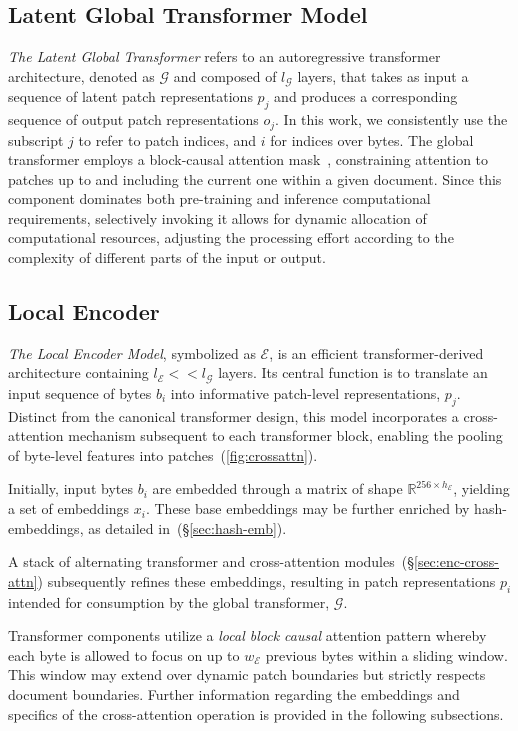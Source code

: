 \subsection{Latent Global Transformer Model}

\textit{The Latent Global Transformer} refers to an autoregressive transformer architecture, denoted as $\mathcal{G}$ and composed of $l_{\mathcal{G}}$ layers, that takes as input a sequence of latent patch representations $p_j$ and produces a corresponding sequence of output patch representations $o_j$. In this work, we consistently use the subscript $j$ to refer to patch indices, and $i$ for indices over bytes. The global transformer employs a block-causal attention mask~\citep{dubey2024llama}, constraining attention to patches up to and including the current one within a given document. Since this component dominates both pre-training and inference computational requirements, selectively invoking it allows for dynamic allocation of computational resources, adjusting the processing effort according to the complexity of different parts of the input or output.

\subsection{Local Encoder}
\label{section:local}

\textit{The Local Encoder Model}, symbolized as $\mathcal{E}$, is an efficient transformer-derived architecture containing $l_{\mathcal{E}} << l_{\mathcal{G}}$ layers. Its central function is to translate an input sequence of bytes $b_i$ into informative patch-level representations, $p_j$. Distinct from the canonical transformer design, this model incorporates a cross-attention mechanism subsequent to each transformer block, enabling the pooling of byte-level features into patches~(\autoref{fig:crossattn}).

Initially, input bytes $b_i$ are embedded through a matrix of shape $\mathbb{R}^{256 \times h_{\mathcal{E}}}$, yielding a set of embeddings $x_i$. These base embeddings may be further enriched by hash-embeddings, as detailed in~(\S\ref{sec:hash-emb}).

A stack of alternating transformer and cross-attention modules~(\S\ref{sec:enc-cross-attn}) subsequently refines these embeddings, resulting in patch representations $p_i$ intended for consumption by the global transformer, $\mathcal{G}$.

Transformer components utilize a \textit{local block causal} attention pattern whereby each byte is allowed to focus on up to $w_{\mathcal{E}}$ previous bytes within a sliding window. This window may extend over dynamic patch boundaries but strictly respects document boundaries. Further information regarding the embeddings and specifics of the cross-attention operation is provided in the following subsections.

